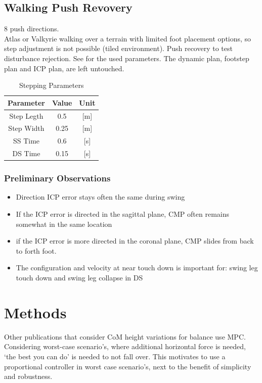 \subsection{Walking Push Revovery}
8 push directions.\\
Atlas or Valkyrie walking over a terrain with limited foot placement options, so step adjustment is not possible (tiled environment). Push recovery to test disturbance rejection. See  for the used parameters. The dynamic plan, footstep plan and \ac{ICP} plan, are left untouched.
\begin{table}[ht]
\caption{Stepping Parameters} %
\centering %
\begin{tabular}{c c c } %
\hline\hline %
Parameter & Value & Unit \\
\hline %
Step Legth & 0.5 &  [m]\\
Step Width & 0.25 & [m]\\
\acs{SS} Time & 0.6 & [s]\\
\acs{DS} Time & 0.15 & [s]\\
\hline %
\end{tabular}
\label{tab:stepping} %
\end{table}
\subsubsection{Preliminary Observations}
\begin{itemize}
	\item Direction \ac{ICP} error stays often the same during swing
	\item If the \ac{ICP} error is directed in the sagittal plane, CMP often remains somewhat in the same location
	\item if the \ac{ICP} error is more directed  in the coronal plane, CMP slides from back to forth foot. 
	\item The configuration and velocity at near touch down is important for: swing leg touch down and swing leg collapse in \ac{DS}
\end{itemize}
\section{Methods}
Other publications that consider \ac{CoM} height variations for balance use \ac{MPC}. Considering worst-case scenario's, where additional horizontal force is needed, `the best you can do' is needed to not fall over. This motivates to use a proportional controller in worst case scenario's, next to the benefit of simplicity and robustness.

